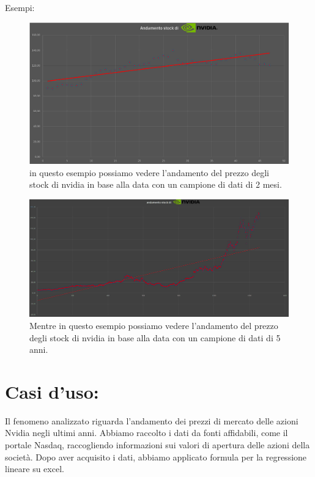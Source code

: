 \documentclass[11pt]{article}
\begin{document}
\begin{center}
    Esempi:\\

\begin{figure}[ht!]
    \centering
    \includegraphics[width=\textwidth]{immagini/Screenshot 2024-11-20 000800.png}
    \caption{in questo esempio possiamo vedere l'andamento del prezzo degli stock di nvidia in base alla data con un campione di dati di 2 mesi.}
\end{figure}
\begin{figure}[ht!]
    \centering
    \includegraphics[width=\textwidth]{immagini/Screenshot 2024-11-20 210756.png}
    \caption{Mentre in questo esempio possiamo vedere l'andamento del prezzo degli stock di nvidia in base alla data con un campione di dati di 5 anni.}
\end{figure}
\end{center}
\section*{Casi d'uso:}
Il fenomeno analizzato riguarda l'andamento dei prezzi di mercato delle azioni Nvidia negli ultimi anni. Abbiamo raccolto i dati da fonti affidabili, come il portale Nasdaq, 
raccogliendo informazioni sui valori di apertura delle azioni della società.
Dopo aver acquisito i dati, abbiamo applicato formula per la regressione lineare su excel.
\end{document}
